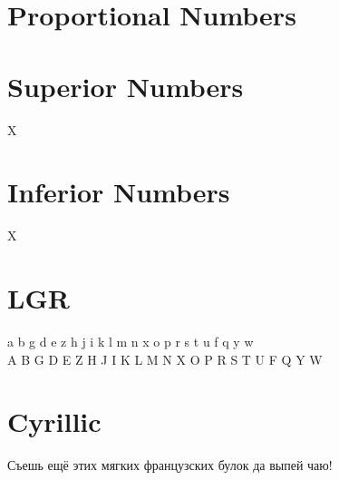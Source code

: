 \documentclass{article}
\begin{document}

\section*{Proportional Numbers}


\section*{Superior Numbers}

X

\section*{Inferior Numbers}

X

\section*{LGR}


{\oldstandardlgr\noindent
 a b g d e z h j i k l m n x o p r s t u f q y w\\
 A B G D E Z H J I K L M N X O P R S T U F Q Y W\\
}

\section*{Cyrillic}

{\ifxetex\else\ifluatex\else{}\selectfont\fi\fi

Съешь ещё этих мягких французских булок да
выпей чаю!}
\end{document}
